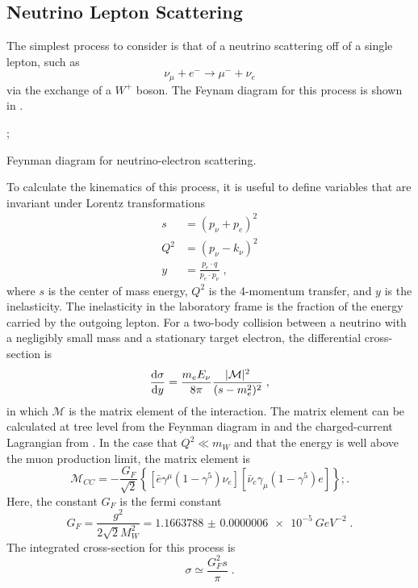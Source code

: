 \subsection{Neutrino Lepton Scattering}
The simplest process to consider is that of a neutrino scattering off of a single lepton, such as
\begin{equation}
    \nu_\mu + e^- \rightarrow \mu^- + \nu_e 
\end{equation}
via the exchange of a $W^+$ boson. The Feynam diagram for this process is shown in . 
\begin{marginfigure}
;
\caption{Feynman diagram for neutrino-electron scattering.\label{fig:feynman-nue-scatter}}
\end{marginfigure}
To calculate the kinematics of this process, it is useful to define variables that are invariant under Lorentz transformations
\begin{equation}
\begin{aligned}
    s &= (p_\nu + p_e)^2 \\
    Q^2 &= (p_\nu - k_\nu)^2 \\
    y &= \frac{p_e \cdot q}{p_e \cdot p_\nu}\;,
\end{aligned}\label{eq:kinematic-quantities}
\end{equation}
where $s$ is the center of mass energy, $Q^2$ is the 4-momentum transfer, and $y$ is the inelasticity. The inelasticity in the laboratory frame is the fraction of the energy carried by the outgoing lepton. For a two-body collision between a neutrino with a negligibly small mass and a stationary target electron, the differential cross-section is
\begin{equation}
    \frac{\mathrm{d} \sigma}{\mathrm{d} y} = \frac{m_e E_\nu}{8\pi}\frac{|\mathcal{M}|^2}{(s-m_e^2)^2}\;,
\end{equation}
in which $\mathcal{M}$ is the matrix element of the interaction. The matrix element can be calculated at tree level from the Feynman diagram in  and the charged-current Lagrangian from . In the case that $Q^2 \ll m_W$ and that the energy is well above the muon production limit, the matrix element is
\begin{equation}
    \mathcal{M}_{CC} = -\frac{G_F}{\sqrt{2}}\left\{ [\bar{e}\gamma^\mu(1-\gamma^5)\nu_e][\bar{\nu}_e\gamma_\mu(1-\gamma^5)e] \right\};.
\end{equation}
Here, the constant $G_F$ is the fermi constant
\begin{equation}
    G_F = \frac{g^2}{2\sqrt{2}M_W^2} = \SI{1.1663788(6)e-5}{GeV^{-2}}\;.
\end{equation}
The integrated cross-section for this process is 
\begin{equation}
    \sigma \simeq \frac{G^2_F s}{\pi}\;.
\end{equation}

